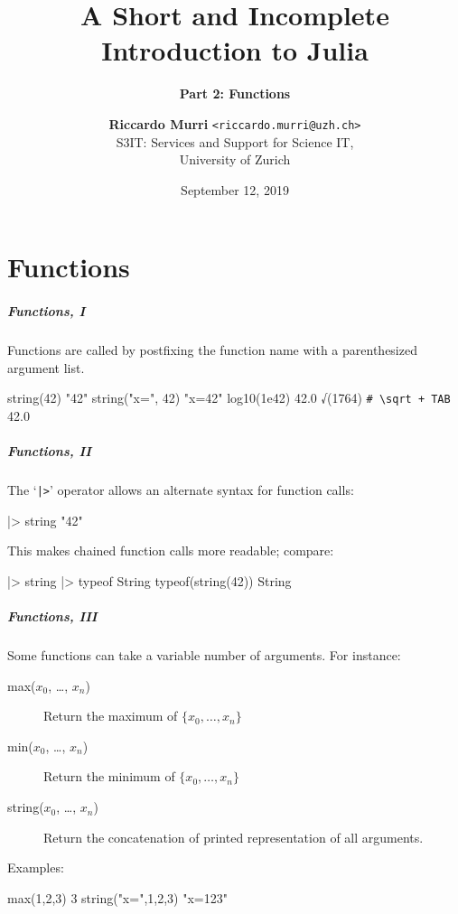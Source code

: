 \documentclass[english,serif,mathserif,xcolor=pdftex,dvipsnames,table]{beamer}
\title[2. Functions]{%
  A Short and Incomplete Introduction to Julia
}
\subtitle{\bfseries Part 2: Functions}
\author[R.~Murri]{%
  \textbf{Riccardo Murri} \texttt{<riccardo.murri@uzh.ch>}
  \\
  S3IT: Services and Support for Science IT,
  \\
  University of Zurich
}
\date{September 12, 2019}
\begin{document}
\maketitle


\part{Functions}

\begin{frame}[fragile,label=func1]
  \frametitle{Functions, I}
  Functions are called by postfixing the function name with a
  parenthesized argument list.

  \+
\begin{semiverbatim}
\julia string(42)
"42"
\julia string("x=", 42)
"x=42"
\julia log10(1e42)
42.0
\julia √(1764)  \lstinline|# \sqrt + TAB|
42.0
\end{semiverbatim}
\end{frame}


\begin{frame}[fragile]
  \frametitle{Functions, II}
  The `\texttt{|>}' operator allows an alternate syntax for function calls:
\begin{semiverbatim}
 |> string
"42"
\end{semiverbatim}

  \+ This makes chained function calls more readable; compare:
\begin{semiverbatim}
 |> string |> typeof
String
\julia typeof(string(42))
String
\end{semiverbatim}
\end{frame}


\begin{frame}
  \frametitle{Functions, III}
  Some functions can take a variable number of arguments. For instance:

  \+
  \begin{description}
    \item[max($x_0$, \ldots, $x_n$)] Return the maximum of $\{ x_0, \ldots, x_n \}$
    \item[min($x_0$, \ldots, $x_n$)] Return the minimum of $\{ x_0, \ldots, x_n \}$
    \item[string($x_0$, \ldots, $x_n$)] Return the concatenation of printed representation of all arguments.
  \end{description}

  \+
  Examples:
\begin{semiverbatim}
\julia max(1,2,3)
3
\julia string("x=",1,2,3)
"x=123"
\end{semiverbatim}
\end{frame}
\end{document}
